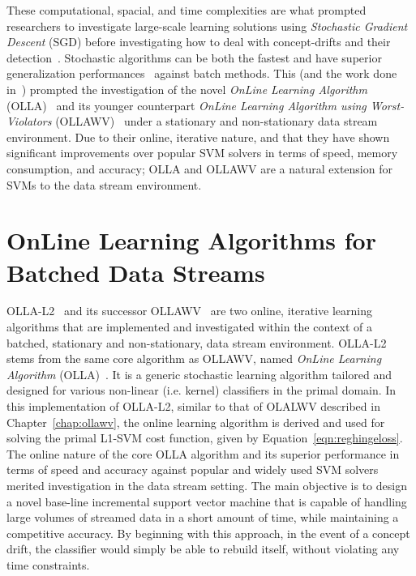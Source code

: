 \documentclass[reqno]{vcuthesis}
\numberwithin{equation}{chapter}
\begin{document}
These computational, spacial, and time complexities are what prompted researchers to investigate large-scale learning solutions using \textit{Stochastic Gradient Descent} (SGD) before investigating how to deal with concept-drifts and their detection~\cite{herbrich2016learning,kivinen2002large,rosenblatt1958perceptron,Schoelkopf2002,Shalev2014,shalev2011pegasos}. Stochastic algorithms can be both the fastest and have superior generalization performances~\cite{bousquet2008tradeoffs,kivinen2004online} against batch methods. This (and the work done in~\cite{Melki2016,kecman2016ieee}) prompted the investigation of the novel \textit{OnLine Learning Algorithm} (OLLA)~\cite{kecman2016fast} and its younger counterpart \textit{OnLine Learning Algorithm using Worst-Violators} (OLLAWV)~\cite{melki2018ollawv} under a stationary and non-stationary data stream environment. Due to their online, iterative nature, and that they have shown significant improvements over popular SVM solvers in terms of speed, memory consumption, and accuracy; OLLA and OLLAWV are a natural extension for SVMs to the data stream environment.

\newpage
\section{OnLine Learning Algorithms for Batched Data Streams}
OLLA-L2~\cite{kecman2016fast} and its successor OLLAWV~\cite{melki2018ollawv} are two online, iterative learning algorithms that are implemented and investigated within the context of a batched, stationary and non-stationary, data stream environment. OLLA-L2 stems from the same core algorithm as OLLAWV, named \textit{OnLine Learning Algorithm} (OLLA)~\cite{kecman2016fast}. It is a generic stochastic learning algorithm tailored and designed for various non-linear (i.e. kernel) classifiers in the primal domain. In this implementation of OLLA-L2, similar to that of OLALWV described in Chapter~\ref{chap:ollawv}, the online learning algorithm is derived and used for solving the primal L1-SVM cost function, given by Equation~\ref{eqn:reghingeloss}. The online nature of the core OLLA algorithm and its superior performance in terms of speed and accuracy against popular and widely used SVM solvers merited investigation in the data stream setting. The main objective is to design a novel base-line incremental support vector machine that is capable of handling large volumes of streamed data in a short amount of time, while maintaining a competitive accuracy. By beginning with this approach, in the event of a concept drift, the classifier would simply be able to rebuild itself, without violating any time constraints. 
\end{document}
